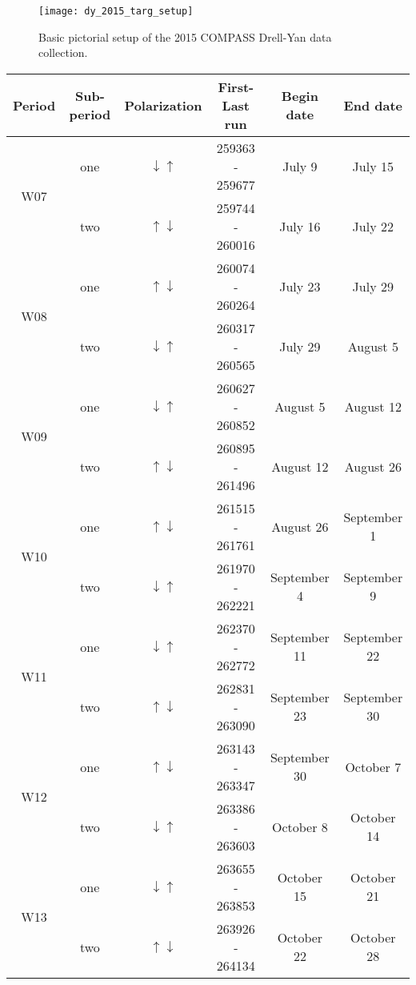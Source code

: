 \begin{figure}[h!t]
  \centering \texttt{[image: dy\_2015\_targ\_setup]}
  \caption{Basic pictorial setup of the 2015 COMPASS Drell-Yan data
    collection.}
  \label{fig::dy_2015_targ_setup}
\end{figure}


\begin{table}[h!t]
  \centering
  \begin{tabular}{ |c|c|c|c|c|c| }
    \hline Period& Sub-period& Polarization& First-Last run& Begin date& End
    date \\ \hline
    
    \multirow{2}{2em}{W07}& one& $\downarrow \uparrow$& 259363 - 259677& July
    9& July 15 \\ & two& $\uparrow \downarrow$& 259744 - 260016& July 16& July
    22 \\ \hline

    \multirow{2}{2em}{W08}& one& $\uparrow \downarrow$& 260074 - 260264& July
    23& July 29 \\ & two& $\downarrow \uparrow$& 260317 - 260565& July 29&
    August 5 \\ \hline

    \multirow{2}{2em}{W09}& one& $\downarrow \uparrow$& 260627 - 260852&
    August 5& August 12 \\ & two& $\uparrow \downarrow$& 260895 - 261496&
    August 12& August 26 \\ \hline

    \multirow{2}{2em}{W10}& one& $\uparrow \downarrow$& 261515 - 261761&
    August 26& September 1 \\ & two& $\downarrow \uparrow$& 261970 - 262221&
    September 4& September 9 \\ \hline

    \multirow{2}{2em}{W11}& one& $\downarrow \uparrow$& 262370 - 262772&
    September 11& September 22 \\ & two& $\uparrow \downarrow$& 262831 -
    263090& September 23& September 30 \\ \hline

    \multirow{2}{2em}{W12}& one& $\uparrow \downarrow$& 263143 - 263347&
    September 30& October 7 \\ & two& $\downarrow \uparrow$& 263386 - 263603&
    October 8& October 14 \\ \hline

    \multirow{2}{2em}{W13}& one& $\downarrow \uparrow$& 263655 - 263853&
    October 15& October 21 \\ & two& $\uparrow \downarrow$& 263926 - 264134&
    October 22& October 28 \\ \hline


\end{tabular}
\end{table}
